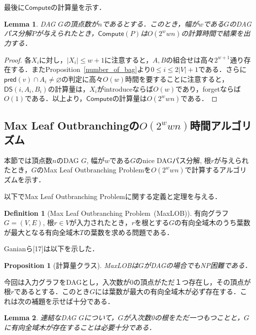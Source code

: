 \documentclass[master]{kuisthesis}		%
\theoremstyle{plain}
\newtheorem{proposition}{Proposition}
\newtheorem{lemma}{Lemma}
\theoremstyle{definition}
\newtheorem{definition*}{Definition}
\begin{document}
最後に$\mathsf{Compute}$の計算量を示す．

\begin{lemma}
    DAG $G$の頂点数が$n$であるとする．このとき，幅が$w$である$G$のDAGパス分解$P$が与えられたとき，$\mathsf{Compute}(P)$は$O(2^wwn)$の計算時間で結果を出力する．
\end{lemma}

\begin{proof}
    各$X_i$に対し，$|X_i| \leq w+1$に注意すると，$A, B$の組合せは高々$2^{w+1}$通り存在する．またProposition~\ref{number_of_bag}より$0 \leq i \leq 2|V|+1$である．さらに$\mathsf{pred}(v) \cap A_i \neq \varnothing$の判定に高々$O(w)$時間を要することに注意すると，$\mathsf{DS}(i, A_i, B_i)$の計算量は，$X_i$がintroduceならば$O(w)$であり，forgetならば$O(1)$である．以上より，$\mathsf{Compute}$の計算量は$O(2^wwn)$である．
\end{proof}











\subsection{Max Leaf Outbranchingの$O(2^wwn)$時間アルゴリズム}

本節では頂点数$n$のDAG $G$, 幅が$w$である$G$のnice DAGパス分解, 根$r$が与えられたとき，$G$のMax Leaf Outbranching Problemを$O(2^wwn)$で計算するアルゴリズムを示す．


以下でMax Leaf Outbranching Problemに関する定義と定理を与える．

\begin{definition*}[Max Leaf Outbranching Problem\ (MaxLOB)]
    有向グラフ $G=(V, E)$, 根$r \in V$が入力されたとき，$r$を根とする$G$の有向全域木のうち葉数が最大となる有向全域木$T$の葉数を求める問題である．
\end{definition*}

Ganianら[17]は以下を示した．

\begin{proposition}[計算量クラス]
    MaxLOBは$G$がDAGの場合でもNP困難である．
\end{proposition}

今回は入力グラフをDAGとし，入次数が0の頂点がただ１つ存在し，その頂点が根$r$であるとする．このとき$G$には葉数が最大の有向全域木が必ず存在する．これは次の補題を示せば十分である．

\begin{lemma}
    連結なDAG $G$について，$G$が入次数0の根をただ一つもつことと，$G$に有向全域木が存在することは必要十分である．
\end{lemma}
\end{document}
